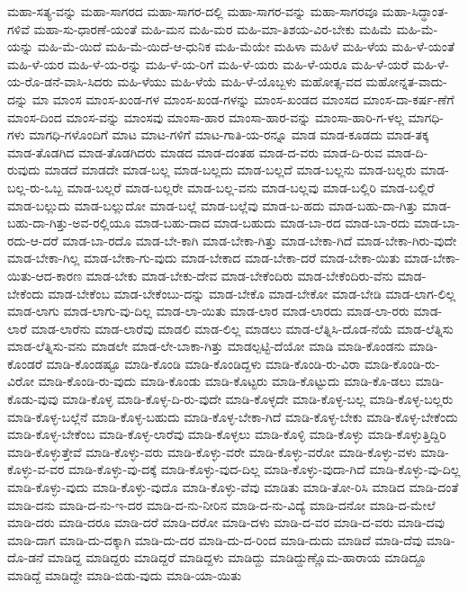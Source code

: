 {ಮಹಾ-ಸತ್ಯ-ವನ್ನು
ಮಹಾ-ಸಾಗರದ
ಮಹಾ-ಸಾಗರ-ದಲ್ಲಿ
ಮಹಾ-ಸಾಗರ-ವನ್ನು
ಮಹಾ-ಸಾಗರವೂ
ಮಹಾ-ಸಿದ್ಧಾಂತ-ಗಳಿವೆ
ಮಹಾ-ಸು-ಧಾರಣೆ-ಯಂತೆ
ಮಹಿ-ಮನ
ಮಹಿ-ಮರ
ಮಹಿ-ಮಾ-ತಿಶಯ-ವಿರ-ಬೇಕು
ಮಹಿಮೆ
ಮಹಿ-ಮೆ-ಯನ್ನು
ಮಹಿ-ಮೆ-ಯಿದೆ
ಮಹಿ-ಮೆ-ಯಿದೆ-ಆ-ಧುನಿಕ
ಮಹಿ-ಮೆಯೇ
ಮಹಿಳಾ
ಮಹಿಳೆ
ಮಹಿ-ಳೆಯ
ಮಹಿ-ಳೆ-ಯಂತೆ
ಮಹಿ-ಳೆ-ಯರ
ಮಹಿ-ಳೆ-ಯ-ರನ್ನು
ಮಹಿ-ಳೆ-ಯ-ರಿಗೆ
ಮಹಿ-ಳೆ-ಯರು
ಮಹಿ-ಳೆ-ಯರೂ
ಮಹಿ-ಳೆ-ಯರೆ
ಮಹಿ-ಳೆ-ಯ-ರೊ-ಡನೆ-ವಾಸಿ-ಸಿದರು
ಮಹಿ-ಳೆಯು
ಮಹಿ-ಳೆಯೆ
ಮಹಿ-ಳೆ-ಯೊಬ್ಬಳು
ಮಹೋತ್ಸ-ವದ
ಮಹೋನ್ನತ-ವಾದು-ದನ್ನು
ಮಾ
ಮಾಂಸ
ಮಾಂಸ-ಖಂಡ-ಗಳ
ಮಾಂಸ-ಖಂಡ-ಗಳನ್ನು
ಮಾಂಸ-ಖಂಡದ
ಮಾಂಸದ
ಮಾಂಸ-ದಾ-ಕರ್ಷ-ಣೆಗೆ
ಮಾಂಸ-ದಿಂದ
ಮಾಂಸ-ವನ್ನು
ಮಾಂಸವು
ಮಾಂಸಾ-ಹಾರ
ಮಾಂಸಾ-ಹಾರ-ವನ್ನು
ಮಾಂಸಾ-ಹಾರಿ-ಗ-ಳಲ್ಲ
ಮಾಗಧಿ-ಗಳು
ಮಾಗಧಿ-ಗಳೊಂದಿಗೆ
ಮಾಟ
ಮಾಟ-ಗಳಿಗೆ
ಮಾಟ-ಗಾತಿ-ಯ-ರನ್ನೂ
ಮಾಡ
ಮಾಡ-ಕೂಡದು
ಮಾಡ-ತಕ್ಕ
ಮಾಡ-ತೊಡಗಿದ
ಮಾಡ-ತೊಡಗಿದರು
ಮಾಡದ
ಮಾಡ-ದಂತಹ
ಮಾಡ-ದ-ವರು
ಮಾಡ-ದಿ-ರುವ
ಮಾಡ-ದಿ-ರುವುದು
ಮಾಡದೆ
ಮಾಡದೇ
ಮಾಡ-ಬಲ್ಲ
ಮಾಡ-ಬಲ್ಲದು
ಮಾಡ-ಬಲ್ಲದೆ
ಮಾಡ-ಬಲ್ಲನು
ಮಾಡ-ಬಲ್ಲರು
ಮಾಡ-ಬಲ್ಲ-ರು-ಒಬ್ಬ
ಮಾಡ-ಬಲ್ಲರೆ
ಮಾಡ-ಬಲ್ಲರೇ
ಮಾಡ-ಬಲ್ಲ-ವನು
ಮಾಡ-ಬಲ್ಲವು
ಮಾಡ-ಬಲ್ಲಿರಿ
ಮಾಡ-ಬಲ್ಲಿರೆ
ಮಾಡ-ಬಲ್ಲುದು
ಮಾಡ-ಬಲ್ಲುದೋ
ಮಾಡ-ಬಲ್ಲೆ
ಮಾಡ-ಬಲ್ಲೆವು
ಮಾಡ-ಬ-ಹದು
ಮಾಡ-ಬಹು-ದಾ-ಗಿತ್ತು
ಮಾಡ-ಬಹು-ದಾ-ಗಿತ್ತು-ಅವ-ರಲ್ಲಿಯೂ
ಮಾಡ-ಬಹು-ದಾದ
ಮಾಡ-ಬಹುದು
ಮಾಡ-ಬಾ-ರದ
ಮಾಡ-ಬಾ-ರದು
ಮಾಡ-ಬಾ-ರದು-ಆ-ದರೆ
ಮಾಡ-ಬಾ-ರದೊ
ಮಾಡ-ಬೇ-ಕಾಗಿ
ಮಾಡ-ಬೇಕಾ-ಗಿತ್ತು
ಮಾಡ-ಬೇಕಾ-ಗಿದೆ
ಮಾಡ-ಬೇಕಾ-ಗಿರು-ವುದೇ
ಮಾಡ-ಬೇಕಾ-ಗಿಲ್ಲ
ಮಾಡ-ಬೇಕಾ-ಗು-ವುದು
ಮಾಡ-ಬೇಕಾದ
ಮಾಡ-ಬೇಕಾ-ದರೆ
ಮಾಡ-ಬೇಕಾ-ಯಿತು
ಮಾಡ-ಬೇಕಾ-ಯಿತು-ಆದ-ಕಾರಣ
ಮಾಡ-ಬೇಕು
ಮಾಡ-ಬೇಕು-ದೇವ
ಮಾಡ-ಬೇಕೆಂದಿರು
ಮಾಡ-ಬೇಕೆಂದಿರು-ವೆನು
ಮಾಡ-ಬೇಕೆಂದು
ಮಾಡ-ಬೇಕೆಂಬ
ಮಾಡ-ಬೇಕೆಂಬು-ದನ್ನು
ಮಾಡ-ಬೇಕೊ
ಮಾಡ-ಬೇಕೋ
ಮಾಡ-ಬೇಡಿ
ಮಾಡ-ಲಾಗ-ಲಿಲ್ಲ
ಮಾಡ-ಲಾಗು
ಮಾಡ-ಲಾಗು-ವು-ದಿಲ್ಲ
ಮಾಡ-ಲಾ-ಯಿತು
ಮಾಡ-ಲಾರ
ಮಾಡ-ಲಾರದು
ಮಾಡ-ಲಾ-ರರು
ಮಾಡ-ಲಾರೆ
ಮಾಡ-ಲಾರೆನು
ಮಾಡ-ಲಾರೆವು
ಮಾಡಲಿ
ಮಾಡ-ಲಿಲ್ಲ
ಮಾಡಲು
ಮಾಡ-ಲೆತ್ನಿಸಿ-ದೊಡ-ನೆಯೆ
ಮಾಡ-ಲೆತ್ನಿಸು
ಮಾಡ-ಲೆತ್ನಿಸು-ವನು
ಮಾಡಲೇ
ಮಾಡ-ಲೇ-ಬಾಕಾ-ಗಿತ್ತು
ಮಾಡಲ್ಪಟ್ಟಿ-ದೆಯೋ
ಮಾಡಿ
ಮಾಡಿ-ಕೊಂಡನು
ಮಾಡಿ-ಕೊಂಡರೆ
ಮಾಡಿ-ಕೊಂಡಷ್ಟೂ
ಮಾಡಿ-ಕೊಂಡಿ
ಮಾಡಿ-ಕೊಂಡಿದ್ದಳು
ಮಾಡಿ-ಕೊಂಡಿ-ರು-ವಿರಾ
ಮಾಡಿ-ಕೊಂಡಿ-ರು-ವಿರೋ
ಮಾಡಿ-ಕೊಂಡಿ-ರು-ವುದು
ಮಾಡಿ-ಕೊಂಡು
ಮಾಡಿ-ಕೊಟ್ಟರು
ಮಾಡಿ-ಕೊಟ್ಟುದು
ಮಾಡಿ-ಕೊ-ಡಲು
ಮಾಡಿ-ಕೊಡು-ವುವು
ಮಾಡಿ-ಕೊಳ್ಳ
ಮಾಡಿ-ಕೊಳ್ಳ-ದಿ-ರು-ವುದೇ
ಮಾಡಿ-ಕೊಳ್ಳದೇ
ಮಾಡಿ-ಕೊಳ್ಳ-ಬಲ್ಲ
ಮಾಡಿ-ಕೊಳ್ಳ-ಬಲ್ಲರು
ಮಾಡಿ-ಕೊಳ್ಳ-ಬಲ್ಲೆನೆ
ಮಾಡಿ-ಕೊಳ್ಳ-ಬಹುದು
ಮಾಡಿ-ಕೊಳ್ಳ-ಬೇಕಾ-ಗಿದೆ
ಮಾಡಿ-ಕೊಳ್ಳ-ಬೇಕು
ಮಾಡಿ-ಕೊಳ್ಳ-ಬೇಕೆಂದು
ಮಾಡಿ-ಕೊಳ್ಳ-ಬೇಕೆಂಬ
ಮಾಡಿ-ಕೊಳ್ಳ-ಲಾರೆವು
ಮಾಡಿ-ಕೊಳ್ಳಲು
ಮಾಡಿ-ಕೊಳ್ಳಿ
ಮಾಡಿ-ಕೊಳ್ಳು
ಮಾಡಿ-ಕೊಳ್ಳುತ್ತಿದ್ದಿರಿ
ಮಾಡಿ-ಕೊಳ್ಳುತ್ತೇವೆ
ಮಾಡಿ-ಕೊಳ್ಳು-ವರು
ಮಾಡಿ-ಕೊಳ್ಳು-ವರೇ
ಮಾಡಿ-ಕೊಳ್ಳು-ವರೋ
ಮಾಡಿ-ಕೊಳ್ಳು-ವಳು
ಮಾಡಿ-ಕೊಳ್ಳು-ವ-ವರ
ಮಾಡಿ-ಕೊಳ್ಳು-ವು-ದಕ್ಕೆ
ಮಾಡಿ-ಕೊಳ್ಳು-ವುದ-ದಿಲ್ಲ
ಮಾಡಿ-ಕೊಳ್ಳು-ವುದಾ-ಗಿದೆ
ಮಾಡಿ-ಕೊಳ್ಳು-ವು-ದಿಲ್ಲ
ಮಾಡಿ-ಕೊಳ್ಳು-ವುದು
ಮಾಡಿ-ಕೊಳ್ಳು-ವುದೊ
ಮಾಡಿ-ಕೊಳ್ಳು-ವೆವು
ಮಾಡಿತು
ಮಾಡಿ-ತೋ-ರಿಸಿ
ಮಾಡಿದ
ಮಾಡಿ-ದಂತೆ
ಮಾಡಿ-ದನು
ಮಾಡಿ-ದ-ನು-ಇ-ದರ
ಮಾಡಿ-ದ-ನು-ನೀರಿನ
ಮಾಡಿ-ದ-ನು-ವಿದ್ಯೆ
ಮಾಡಿ-ದನೋ
ಮಾಡಿ-ದ-ಮೇಲೆ
ಮಾಡಿ-ದರು
ಮಾಡಿ-ದರೂ
ಮಾಡಿ-ದರೆ
ಮಾಡಿ-ದರೋ
ಮಾಡಿ-ದಳು
ಮಾಡಿ-ದ-ವರ
ಮಾಡಿ-ದ-ವರು
ಮಾಡಿ-ದವು
ಮಾಡಿ-ದಾಗ
ಮಾಡಿ-ದು-ದಕ್ಕಾಗಿ
ಮಾಡಿ-ದು-ದರ
ಮಾಡಿ-ದು-ದ-ರಿಂದ
ಮಾಡಿ-ದುದು
ಮಾಡಿದೆ
ಮಾಡಿ-ದೆವು
ಮಾಡಿ-ದೊ-ಡನೆ
ಮಾಡಿದ್ದ
ಮಾಡಿದ್ದರು
ಮಾಡಿದ್ದರೆ
ಮಾಡಿದ್ದಳು
ಮಾಡಿದ್ದು
ಮಾಡಿದ್ದುಣ್ಣೊಮ-ಹಾರಾಯ
ಮಾಡಿದ್ದೂ
ಮಾಡಿದ್ದೆ
ಮಾಡಿದ್ದೇ
ಮಾಡಿ-ಬಿಡು-ವುದು
ಮಾಡಿ-ಯಾ-ಯಿತು
}
